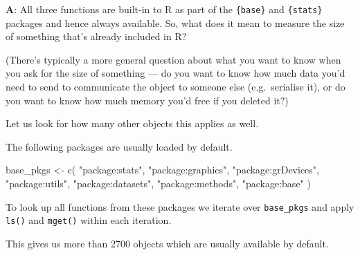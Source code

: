\documentclass[
]{krantz}
\makeatletter
\newenvironment{Shaded}{\begin{snugshade}}{\end{snugshade}}
\newcommand{\ControlFlowTok}[1]{\textcolor[rgb]{0.13,0.29,0.53}{\textbf{#1}}}
\newcommand{\DataTypeTok}[1]{\textcolor[rgb]{0.13,0.29,0.53}{#1}}
\newcommand{\KeywordTok}[1]{\textcolor[rgb]{0.13,0.29,0.53}{\textbf{#1}}}
\newcommand{\NormalTok}[1]{#1}
\newcommand{\OperatorTok}[1]{\textcolor[rgb]{0.81,0.36,0.00}{\textbf{#1}}}
\newcommand{\OtherTok}[1]{\textcolor[rgb]{0.56,0.35,0.01}{#1}}
\newcommand{\StringTok}[1]{\textcolor[rgb]{0.31,0.60,0.02}{#1}}
\newenvironment{kframe}{%
\medskip{}
\setlength{\fboxsep}{.8em}
 \def\at@end@of@kframe{}%
 \ifinner\ifhmode%
  \def\at@end@of@kframe{\end{minipage}}%
  \begin{minipage}{\columnwidth}%
 \fi\fi%
 \def\FrameCommand##1{\hskip\@totalleftmargin \hskip-\fboxsep
 \colorbox{shadecolor}{##1}\hskip-\fboxsep
     \hskip-\linewidth \hskip-\@totalleftmargin \hskip\columnwidth}%
 \MakeFramed {\advance\hsize-\width
   \@totalleftmargin\z@ \linewidth\hsize
   \@setminipage}}%
 {\par\unskip\endMakeFramed%
 \at@end@of@kframe}
\renewenvironment{Shaded}{\begin{kframe}}{\end{kframe}}
\renewcommand{\KeywordTok} [1]{\textcolor[rgb]{0.00,0.44,0.13}{{#1}}}
\renewcommand{\DataTypeTok}[1]{\textcolor[rgb]{0.56,0.13,0.00}{{#1}}}
\renewcommand{\StringTok}  [1]{\textcolor[rgb]{0.25,0.44,0.63}{{#1}}}
\renewcommand{\OtherTok}   [1]{\textcolor[rgb]{0.00,0.44,0.13}{{#1}}}
\renewcommand{\NormalTok}  [1]{{#1}}
\makeatother
\begin{document}
\textbf{{A}}: All three functions are built-in to R as part of the \texttt{\{base\}} and \texttt{\{stats\}} packages and hence always available. So, what does it mean to measure the size of something that's already included in R?

(There's typically a more general question about what you want to know when you ask for the size of something --- do you want to know how much data you'd need to send to communicate the object to someone else (e.g.~serialise it), or do you want to know how much memory you'd free if you deleted it?)

Let us look for how many other objects this applies as well.

The following packages are usually loaded by default.

\begin{Shaded}
\begin{Highlighting}[]
\NormalTok{base_pkgs <-}\StringTok{ }\KeywordTok{c}\NormalTok{(}
  \StringTok{"package:stats"}\NormalTok{, }\StringTok{"package:graphics"}\NormalTok{, }\StringTok{"package:grDevices"}\NormalTok{,}
  \StringTok{"package:utils"}\NormalTok{, }\StringTok{"package:datasets"}\NormalTok{, }\StringTok{"package:methods"}\NormalTok{,}
  \StringTok{"package:base"}
\NormalTok{)}
\end{Highlighting}
\end{Shaded}

To look up all functions from these packages we iterate over \texttt{base\_pkgs} and apply \texttt{ls()} and \texttt{mget()} within each iteration.

\begin{Shaded}
\end{Shaded}

This gives us more than 2700 objects which are usually available by default.
\end{document}
